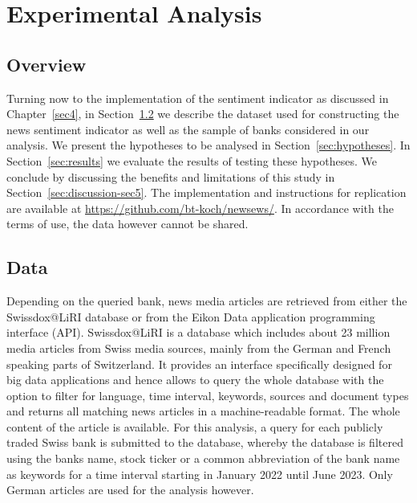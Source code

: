 \chapter{Experimental Analysis}\label{sec5}
\thispagestyle{empty}

\section{Overview}

Turning now to the implementation of the sentiment indicator as discussed in \mbox{Chapter~\ref{sec4}}, in \mbox{Section~\ref{sec:data}} we describe the dataset used for constructing the news sentiment indicator as well as the sample of banks considered in our analysis. We present the hypotheses to be analysed in \mbox{Section~\ref{sec:hypotheses}}. In \mbox{Section~\ref{sec:results}} we evaluate the results of testing these hypotheses. We conclude by discussing the benefits and limitations of this study in \mbox{Section~\ref{sec:discussion-sec5}}. The implementation and instructions for replication are available at \url{https://github.com/bt-koch/newsews/}. In accordance with the terms of use, the data however cannot be shared.

\section{Data} \label{sec:data}

Depending on the queried bank, news media articles are retrieved from either the Swissdox@LiRI database or from the Eikon Data application programming interface (API). Swissdox@LiRI is a database which includes about 23 million media articles from Swiss media sources, mainly from the German and French speaking parts of Switzerland. It provides an interface specifically designed for big data applications and hence allows to query the whole database with the option to filter for language, time interval, keywords, sources and document types and returns all matching news articles in a machine-readable format. The whole content of the article is available. For this analysis, a query for each publicly traded Swiss bank is submitted to the database, whereby the database is filtered using the banks name, stock ticker or a common abbreviation of the bank name as keywords for a time interval starting in January 2022 until June 2023. Only German articles are used for the analysis however. \\

